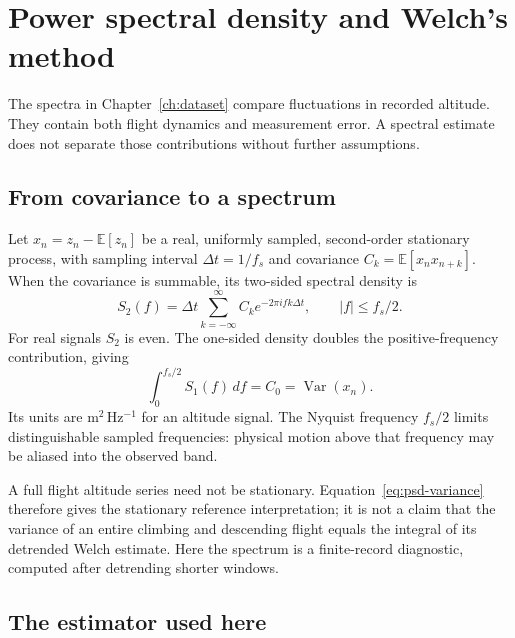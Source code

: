 \chapter{Power spectral density and Welch's method}
\label{app:psd}

The spectra in Chapter~\ref{ch:dataset} compare fluctuations in recorded altitude.
They contain both flight dynamics and measurement error. A spectral estimate does
not separate those contributions without further assumptions.

\section{From covariance to a spectrum}

Let $x_n=z_n-\mathbb E[z_n]$ be a real, uniformly sampled, second-order stationary
process, with sampling interval $\Delta t=1/f_s$ and covariance
$C_k=\mathbb E[x_nx_{n+k}]$. When the covariance is summable, its two-sided spectral
density is
\begin{equation}
 S_2(f)=\Delta t\sum_{k=-\infty}^{\infty}C_k
              e^{-2\pi i f k\Delta t},\qquad |f|\leq f_s/2.
\end{equation}
For real signals $S_2$ is even. The one-sided density doubles the positive-frequency
contribution, giving
\begin{equation}
 \int_0^{f_s/2} S_1(f)\,df=C_0=\operatorname{Var}(x_n).
 \label{eq:psd-variance}
\end{equation}
Its units are $\mathrm{m^2\,Hz^{-1}}$ for an altitude signal. The Nyquist frequency
$f_s/2$ limits distinguishable sampled frequencies: physical motion above that
frequency may be aliased into the observed band.

A full flight altitude series need not be stationary. Equation~\eqref{eq:psd-variance}
therefore gives the stationary reference interpretation; it is not a claim that
the variance of an entire climbing and descending flight equals the integral of
its detrended Welch estimate. Here the spectrum is a finite-record diagnostic,
computed after detrending shorter windows.

\section{The estimator used here}

